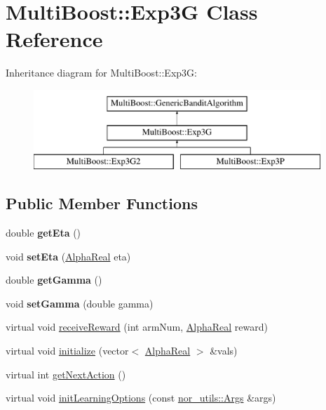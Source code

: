 \hypertarget{classMultiBoost_1_1Exp3G}{\section{Multi\-Boost\-:\-:Exp3\-G Class Reference}
\label{classMultiBoost_1_1Exp3G}
}
Inheritance diagram for Multi\-Boost\-:\-:Exp3\-G\-:\begin{figure}[H]
\begin{center}
\leavevmode
\includegraphics[height=3.000000cm]{classMultiBoost_1_1Exp3G}
\end{center}
\end{figure}
\subsection*{Public Member Functions}
\begin{DoxyCompactItemize}
\item 
\hypertarget{classMultiBoost_1_1Exp3G_ac3555ffff618368ff300b2fa2d66afd8}{double {\bfseries get\-Eta} ()}\label{classMultiBoost_1_1Exp3G_ac3555ffff618368ff300b2fa2d66afd8}

\item 
\hypertarget{classMultiBoost_1_1Exp3G_a36824f84e85cb68dd482eb95743fe07a}{void {\bfseries set\-Eta} (\hyperlink{Defaults_8h_a80184c4fd10ab70a1a17c5f97dcd1563}{Alpha\-Real} eta)}\label{classMultiBoost_1_1Exp3G_a36824f84e85cb68dd482eb95743fe07a}

\item 
\hypertarget{classMultiBoost_1_1Exp3G_a04245cb775351595d57acd4f430e8b7e}{double {\bfseries get\-Gamma} ()}\label{classMultiBoost_1_1Exp3G_a04245cb775351595d57acd4f430e8b7e}

\item 
\hypertarget{classMultiBoost_1_1Exp3G_a712fa979f4b05c25f64316b83f4fdfb8}{void {\bfseries set\-Gamma} (double gamma)}\label{classMultiBoost_1_1Exp3G_a712fa979f4b05c25f64316b83f4fdfb8}

\item 
virtual void \hyperlink{classMultiBoost_1_1Exp3G_ae741868b98353d0095e6e388dff77372}{receive\-Reward} (int arm\-Num, \hyperlink{Defaults_8h_a80184c4fd10ab70a1a17c5f97dcd1563}{Alpha\-Real} reward)
\item 
virtual void \hyperlink{classMultiBoost_1_1Exp3G_af0a9d437a33cc4bc9c9b24c85dfa0f91}{initialize} (vector$<$ \hyperlink{Defaults_8h_a80184c4fd10ab70a1a17c5f97dcd1563}{Alpha\-Real} $>$ \&vals)
\item 
virtual int \hyperlink{classMultiBoost_1_1Exp3G_a35820a70acd39c4acd3458f72f013bac}{get\-Next\-Action} ()
\item 
virtual void \hyperlink{classMultiBoost_1_1Exp3G_aea72d9f2057818dda38b37727f7de9c2}{init\-Learning\-Options} (const \hyperlink{classnor__utils_1_1Args}{nor\-\_\-utils\-::\-Args} \&args)
\end{DoxyCompactItemize}
